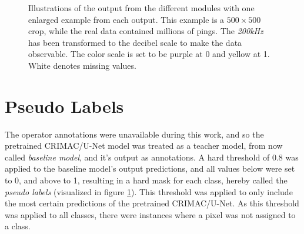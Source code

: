         
        \begin{figure}[H]   
            \centering
            
            \caption[Module outputs illustration]{Illustrations of the output from the different modules with one enlarged example from each output. This example is a $500\times500$ crop, while the real data contained millions of pings. The \textit{200kHz} has been transformed to the decibel scale to make the data observable. The color scale is set to be purple at 0 and yellow at 1. White denotes missing values.}
          	\medskip 
            \label{Module_outputs_illustration_fig}
        \end{figure}

    \section{Pseudo Labels} \label{Pseudo label}
        The operator annotations were unavailable during this work, and so the pretrained CRIMAC/U-Net model was treated as a teacher model, from now called \textit{baseline model}, and it's output as annotations. A hard threshold of 0.8 was applied to the baseline model’s output predictions, and all values below were set to 0, and above to 1, resulting in a hard mask for each class, hereby called the \textit{pseudo labels} (visualized in figure \ref{Pseudo label}). This threshold was applied to only include the most certain predictions of the pretrained CRIMAC/U-Net. As this threshold was applied to all classes, there were instances where a pixel was not assigned to a class.
        
        
